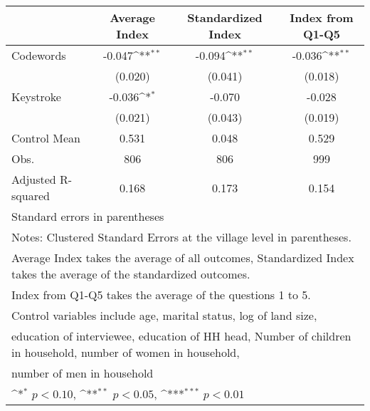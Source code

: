 {
\def\sym#1{\ifmmode^{#1}\else\(^{#1}\)\fi}
\begin{tabular}{l*{3}{c}}
\toprule
                &\multicolumn{1}{c}{Average Index}&\multicolumn{1}{c}{Standardized Index}&\multicolumn{1}{c}{Index from Q1-Q5}\\
\midrule
Codewords       &   -0.047\sym{**} &   -0.094\sym{**} &   -0.036\sym{**} \\
                &  (0.020)         &  (0.041)         &  (0.018)         \\
Keystroke       &   -0.036\sym{*}  &   -0.070         &   -0.028         \\
                &  (0.021)         &  (0.043)         &  (0.019)         \\
\midrule
Control Mean    &    0.531         &    0.048         &    0.529         \\
Obs.            &      806         &      806         &      999         \\
Adjusted R-squared&    0.168         &    0.173         &    0.154         \\
\bottomrule
\multicolumn{4}{l}{\footnotesize Standard errors in parentheses}\\
\multicolumn{4}{l}{\footnotesize Notes: Clustered Standard Errors at the village level in parentheses.}\\
\multicolumn{4}{l}{\footnotesize Average Index takes the average of all outcomes, Standardized Index takes the average of the standardized outcomes.}\\
\multicolumn{4}{l}{\footnotesize Index from Q1-Q5 takes the average of the questions 1 to 5.}\\
\multicolumn{4}{l}{\footnotesize Control variables include age, marital status, log of land size,}\\
\multicolumn{4}{l}{\footnotesize education of interviewee, education of HH head, Number of children in household, number of women in household,}\\
\multicolumn{4}{l}{\footnotesize number of men in household}\\
\multicolumn{4}{l}{\footnotesize \sym{*} \(p<0.10\), \sym{**} \(p<0.05\), \sym{***} \(p<0.01\)}\\
\end{tabular}
}

